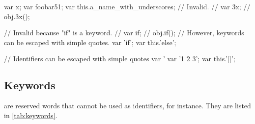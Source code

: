 \begin{urbiscript}
var x;
var foobar51;
var this.a_name_with_underscores;
// Invalid.
// var 3x;
// obj.3x();

// Invalid because "if" is a keyword.
// var if;
// obj.if();
// However, keywords can be escaped with simple quotes.
var 'if';
var this.'else';

// Identifiers can be escaped with simple quotes
var '%
var '1 2 3';
var this.'[]';
\end{urbiscript}

\subsection{Keywords}
\label{sec:syn-key}

 are reserved words that cannot be used as identifiers,
for instance.  They are listed in \autoref{tab:keywords}.

